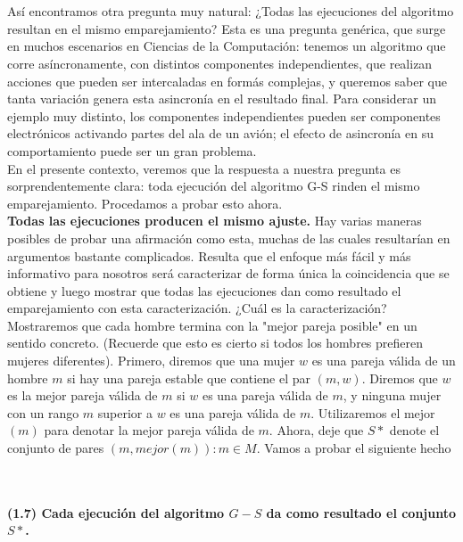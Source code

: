 \documentclass[a4paper]{article}
\begin{document}
\\
\\
Así encontramos otra pregunta muy natural: ¿Todas las ejecuciones del algoritmo resultan en el mismo emparejamiento? Esta es una pregunta genérica, que surge en muchos escenarios en Ciencias de la Computación: tenemos un algoritmo que corre asíncronamente, con distintos componentes independientes, que realizan acciones que pueden ser intercaladas en formás complejas, y queremos saber que tanta variación genera esta asincronía en el resultado final. Para considerar un ejemplo muy distinto, los componentes independientes pueden ser componentes electrónicos activando partes del ala de un avión; el efecto de asincronía en su comportamiento puede ser un gran problema.\\

En el presente contexto, veremos que la respuesta a nuestra pregunta es sorprendentemente clara: toda ejecución del algoritmo G-S rinden el mismo emparejamiento. Procedamos a probar esto ahora.\\

\textbf{Todas las ejecuciones producen el mismo ajuste.}
Hay varias maneras posibles de probar una afirmación como esta, muchas de las cuales resultarían en argumentos bastante complicados. Resulta que el enfoque más fácil y más informativo para nosotros será caracterizar de forma única la coincidencia que se obtiene y luego mostrar que todas las ejecuciones dan como resultado el emparejamiento con esta caracterización.
¿Cuál es la caracterización? Mostraremos que cada hombre termina con la "mejor pareja posible" en un sentido concreto. (Recuerde que esto es cierto si todos los hombres prefieren mujeres diferentes). Primero, diremos que una mujer $w$ es una pareja válida de un hombre $m$ si hay una pareja estable que contiene el par $(m, w)$. Diremos que $w$ es la mejor pareja válida de $m$ si $w$ es una pareja válida de $m$, y ninguna mujer con un rango $m$ superior a $w$ es una pareja válida de $m$. Utilizaremos el mejor $(m)$ para denotar la mejor pareja válida de $m$. Ahora, deje que $S*$ denote el conjunto de pares ${(m, mejor (m)): m  \in  M}$. Vamos a probar el siguiente hecho\\ \\\\
 \colorbox{mygray}{\parbox{15cm}{
\textbf{(1.7) Cada ejecución del algoritmo $G-S$ da como resultado el conjunto $S*$.}}}\\
      \\
      
\end{document}
